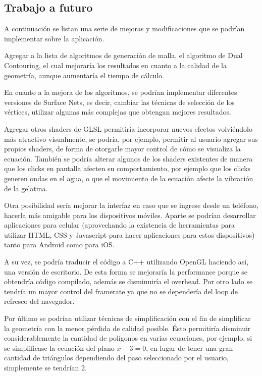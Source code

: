 \documentclass[12pt]{article}
\begin{document}
\subsection{Trabajo a futuro}
A continuación se listan una serie de mejoras y modificaciones que se podrían implementar sobre la aplicación.

Agregar a la lista de algoritmos de generación de malla, el algoritmo de Dual Contouring\cite{dualcontour}, el cual mejoraría los resultados en cuanto a la calidad de la geometría, aunque aumentaría el tiempo de cálculo. 

En cuanto a la mejora de los algoritmos, se podrían implementar diferentes versiones de Surface Nets, es decir, cambiar las técnicas de selección de los vértices, utilizar algunas más complejas que obtengan mejores resultados.

Agregar otros shaders de GLSL permitiría incorporar nuevos efectos volviéndolo más atractivo visualmente, se podría, por ejemplo, permitir al usuario agregar sus propios shaders, de forma de otorgarle  mayor control de cómo se visualiza la ecuación. También se podría alterar algunos de los shaders existentes de manera que los clicks en pantalla afecten su comportamiento, por ejemplo que los clicks generen ondas en el agua, o que el movimiento de la ecuación afecte la vibración de la gelatina.

Otra posibilidad sería mejorar la interfaz en caso que se ingrese desde un teléfono, hacerla más amigable para los dispositivos móviles. Aparte se podrían desarrollar aplicaciones para celular (aprovechando la existencia de herramientas para utilizar HTML, CSS y Javascript para hacer aplicaciones para estos dispositivos) tanto para Android como para iOS. 

A su vez, se podría traducir el código a C++ utilizando OpenGL haciendo así, una versión de escritorio. De esta forma se mejoraría la performance porque se obtendría código compilado, además se disminuiría el overhead. Por otro lado se tendría un mayor control del framerate ya que no se dependería del loop de refresco del navegador.

Por último se podrían utilizar técnicas de simplificación\cite{simplificacion}\cite{realtimerendering} con el fin de simplificar la geometría con la menor pérdida de calidad posible. Ésto permitiría disminuir considerablemente la cantidad de polígonos en varias ecuaciones, por ejemplo, si se simplificase la ecuación del plano $x-3=0$, en lugar de tener una gran cantidad de triángulos dependiendo del paso seleccionado por el usuario, simplemente se tendrían 2.
\end{document}
